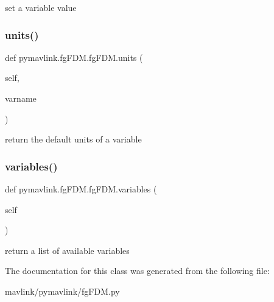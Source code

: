 \begin{DoxyVerb}set a variable value\end{DoxyVerb}
 \mbox{\label{classpymavlink_1_1fgFDM_1_1fgFDM_a57c41f1b87ecb4bff8d40e63cf7ba6d5}} 
\subsubsection{\texorpdfstring{units()}{units()}}
{\footnotesize\ttfamily def pymavlink.\+fg\+F\+D\+M.\+fg\+F\+D\+M.\+units (\begin{DoxyParamCaption}\item[{}]{self,  }\item[{}]{varname }\end{DoxyParamCaption})}

\begin{DoxyVerb}return the default units of a variable\end{DoxyVerb}
 \mbox{\label{classpymavlink_1_1fgFDM_1_1fgFDM_ae0756cde090c7a8a0cf9c08a6cbd700e}} 
\subsubsection{\texorpdfstring{variables()}{variables()}}
{\footnotesize\ttfamily def pymavlink.\+fg\+F\+D\+M.\+fg\+F\+D\+M.\+variables (\begin{DoxyParamCaption}\item[{}]{self }\end{DoxyParamCaption})}

\begin{DoxyVerb}return a list of available variables\end{DoxyVerb}
 

The documentation for this class was generated from the following file\+:\begin{DoxyCompactItemize}
\item 
mavlink/pymavlink/fg\+F\+D\+M.\+py\end{DoxyCompactItemize}
